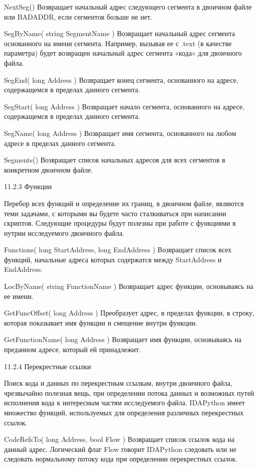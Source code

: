 \documentclass[12pt, a4paper, oneside]{book}
\begin{document}
NextSeg()
Возвращает начальный адрес следующего сегмента в двоичном файле или BADADDR, если сегментов больше не нет.

SegByName( string SegmentName )
Возвращает начальный адрес сегмента основанного на имени сегмента. Например, вызывая ее с .text (в качестве параметра) будет возвращен начальный адрес сегмента «кода» для двоичного файла.

SegEnd( long Address )
Возвращает конец сегмента, основанного на адресе, содержащемся в пределах данного сегмента.

SegStart( long Address )
Возвращает начало сегмента, основанного на адресе, содержащемся в пределах данного сегмента.

SegName( long Address )
Возвращает имя сегмента, основанного на любом адресе в пределах данного сегмента.

Segments()
Возвращает список начальных адресов для всех сегментов в конкретном двоичном файле.

11.2.3 Функции

Перебор всех функций и определение их границ, в двоичном файле, являются теми задачами, с которыми вы будете часто сталкиваться при написании скриптов. Следующие процедуры будут полезны при работе с функциями в нутрии исследуемого двоичного файла.

Functions( long StartAddress, long EndAddress )
Возвращает список всех функций, начальные адреса которых содержатся между StartAddress и EndAddress.

LocByName( string FunctionName )
Возвращает адрес функции, основываясь на ее имени.

GetFuncOffset( long Address )
Преобразует адрес, в пределах функции, в строку, которая показывает имя функции и смещение внутри функции.

GetFunctionName( long Address )
Возвращает имя функции, основываясь на преданном адресе, который ей принадлежит.

11.2.4 Перекрестные ссылки

Поиск кода и данных по перекрестным ссылкам, внутри двоичного файла, чрезвычайно полезная вещь, при определении потока данных и возможных путей исполнения кода к интересным частям исследуемого файла. IDAPython имеет множество функций, используемых для определения различных перекрестных ссылок.

CodeRefsTo( long Address, bool Flow )
Возвращает список ссылок кода на данный адрес. Логический флаг Flow говорит IDAPython следовать или не следовать нормальному потоку кода при определении перекрестных ссылок.
\end{document}
